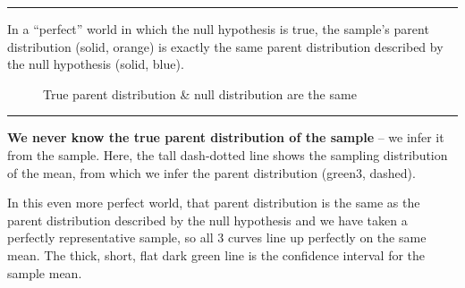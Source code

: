 \documentclass[
  letterpaper,
  DIV=11,
  numbers=noendperiod]{scrreprt}
\begin{document}
\begin{center}\rule{0.5\linewidth}{0.5pt}\end{center}

In a ``perfect'' world in which the null hypothesis is true, the
sample's parent distribution (solid, orange) is exactly the same parent
distribution described by the null hypothesis (solid, blue).

\begin{figure}


\caption{\label{fig-5-5.null_identical_sample}True parent distribution
\& null distribution are the same}

\end{figure}%

\begin{center}\rule{0.5\linewidth}{0.5pt}\end{center}

\textbf{We never know the true parent distribution of the sample} -- we
infer it from the sample. Here, the tall dash-dotted line shows the
sampling distribution of the mean, from which we infer the parent
distribution (green3, dashed).

In this even more perfect world, that parent distribution is the same as
the parent distribution described by the null hypothesis and we have
taken a perfectly representative sample, so all 3 curves line up
perfectly on the same mean. The thick, short, flat dark green line is
the confidence interval for the sample mean.
\end{document}
